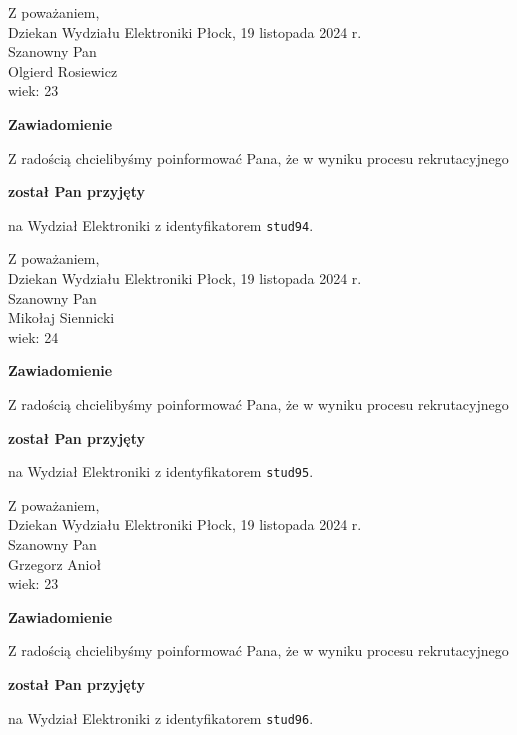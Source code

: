 \documentclass[12pt,a4paper]{article}
\begin{document}
\noindent
Z poważaniem,\\
Dziekan
Wydziału Elektroniki
\newpage
\hfill Płock, 19 listopada 2024 r.\\ 
\noindent 
Szanowny Pan \\
Olgierd Rosiewicz \\
wiek: 23

\bigskip

\begin{center}
{\Large\textbf{Zawiadomienie}}
\end{center}
\bigskip
Z radością chcielibyśmy poinformować Pana, że w wyniku procesu rekrutacyjnego
\begin{center}
\textsf{\textbf{został Pan przyjęty}} 
\end{center}
na Wydział Elektroniki z identyfikatorem \verb|stud94|.
\vspace{2cm}

\noindent
Z poważaniem,\\
Dziekan
Wydziału Elektroniki
\newpage
\hfill Płock, 19 listopada 2024 r.\\ 
\noindent 
Szanowny Pan \\
Mikołaj Siennicki \\
wiek: 24

\bigskip

\begin{center}
{\Large\textbf{Zawiadomienie}}
\end{center}
\bigskip
Z radością chcielibyśmy poinformować Pana, że w wyniku procesu rekrutacyjnego
\begin{center}
\textsf{\textbf{został Pan przyjęty}} 
\end{center}
na Wydział Elektroniki z identyfikatorem \verb|stud95|.
\vspace{2cm}

\noindent
Z poważaniem,\\
Dziekan
Wydziału Elektroniki
\newpage
\hfill Płock, 19 listopada 2024 r.\\ 
\noindent 
Szanowny Pan \\
Grzegorz Anioł \\
wiek: 23

\bigskip

\begin{center}
{\Large\textbf{Zawiadomienie}}
\end{center}
\bigskip
Z radością chcielibyśmy poinformować Pana, że w wyniku procesu rekrutacyjnego
\begin{center}
\textsf{\textbf{został Pan przyjęty}} 
\end{center}
na Wydział Elektroniki z identyfikatorem \verb|stud96|.
\vspace{2cm}
\end{document}
